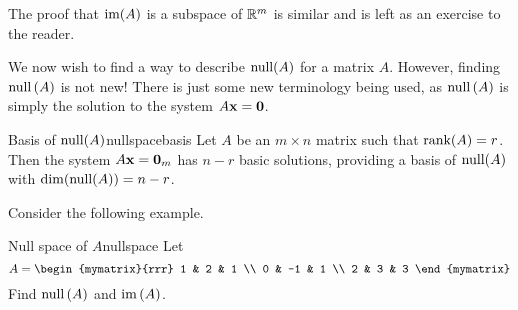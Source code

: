 The proof that $\mbox{im}(A)$ is a subspace of $\mathbb{R}^m$ is similar and is left as an exercise to the reader. 

We now wish to find a way to describe $\mbox{null}(A)$ for a matrix $A$. However, finding $\mbox{null} \left(A\right)$ is not new! There is just some new
terminology being used, as $\mbox{null} \left(A\right) $ is simply the solution
to the system $A{\bf x}={\bf 0}$.

\begin{theorem}{Basis of $\mbox{null}(A)$}{nullspacebasis}
Let $A$ be an $m \times n$ matrix such that $\mbox{rank}(A) = r$. Then the system $A{\bf x}={\bf 0}_m$ has $n-r$ basic solutions, providing a basis of $\mbox{null}(A)$ with $\dim(\mbox{null}(A))=n-r$.
\end{theorem}

Consider the following example. 

\begin{example}{Null space of $A$}{nullspace}
Let
\begin{equation*}
A=\begin{mymatrix}{rrr}
1 & 2 & 1 \\
0 & -1 & 1 \\
2 & 3 & 3
\end{mymatrix} 
\end{equation*}
Find $\mbox{null} \left(A\right) $ and $\mbox{im}\left(A\right)$.
\end{example}

